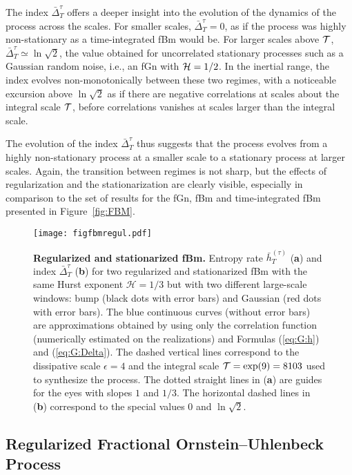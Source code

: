 \documentclass[aps,pra,groupedaddress,notitlepage]{revtex4-1}
\begin{document}
The index $\bar{\Delta}_T^{\tau}$ offers a deeper insight into the evolution of the dynamics of the process across the scales.
For smaller scales, $\bar{\Delta}_T^{\tau}=0$, as if the process was highly non-stationary as  a time-integrated fBm would be.
For larger scales above ${\cal T}$, $\bar{\Delta}_T^{\tau}\simeq \ln\sqrt{2}$, the value obtained for uncorrelated stationary processes such as a Gaussian random noise, {i.e.}, an fGn with ${\cal H}=1/2$.
In the inertial range, the index evolves non-monotonically between these two regimes, with a noticeable excursion above $\ln\sqrt{2}$ as if there are negative correlations at scales about the integral scale ${\cal T}$, before correlations vanishes at scales larger than the integral scale.

 
The evolution of the index $\bar{\Delta}_T^{\tau}$ thus suggests that the process evolves from a highly non-stationary process at a smaller scale to a stationary process at larger scales. Again, the transition between regimes is not sharp, but the effects of regularization and the stationarization are clearly visible, especially in comparison to the set of results for the fGn, fBm and time-integrated fBm presented in Figure~\ref{fig:FBM}.


\begin{figure}[htb]
\texttt{[image: figfbmregul.pdf]}
\caption{{\bf Regularized and stationarized fBm.} 
Entropy rate $\bar{h}_T^{(\tau)}$ (\textbf{a}) and index $\bar{\Delta}_T^{\tau}$ (\textbf{b}) for two regularized and stationarized fBm with the same Hurst exponent $\mathcal{H}=1/3$ but with two different large-scale windows: bump (black {dots with error bars}) and Gaussian (red {dots with error bars}).
The blue continuous curves {(without error bars)} are approximations obtained by using only the correlation function (numerically estimated on the realizations) and Formulas (\ref{eq:G:h}) and (\ref{eq:G:Delta}).
The dashed vertical lines correspond to the dissipative scale $\epsilon=4$ and the integral scale ${\cal T}=\exp(9)=8103$ used to synthesize the process. 
The dotted straight lines in (\textbf{a}) are guides for the eyes with slopes $1$ and $1/3$. 
The horizontal dashed lines in (\textbf{b}) correspond to the special values $0$ and $\ln\sqrt{2}$.
}
\label{fig:fbmRegulBump1}
\end{figure}

\subsection{Regularized Fractional Ornstein--Uhlenbeck Process}
\end{document}
